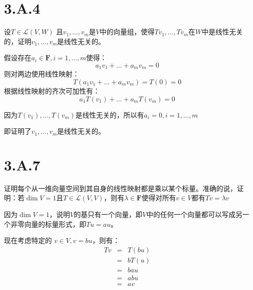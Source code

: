 \documentclass[10pt,a4paper,UTF8]{article}
\begin{document}
\section{3.A.4}
\label{sec:org779eb8a}


\begin{problem}
设\(T\in \mathcal{L}(V,W)\)  且\(v_{1},\ldots ,v_{m}\)是\(V\)中的向量组，使得\(Tv_{1},\ldots ,Tv_{m}\)在\(W\)中是线性无关的，证明\(v_{1},\ldots ,v_{m}\)是线性无关的。
\end{problem}

\begin{answer}
假设存在\(a_{i}\in \mathbf{F},i=1,\ldots ,m\)使得：
\begin{equation}
\label{eq:8}
a_{1}v_{1} + \ldots + a_{m}v_{m} = 0
\end{equation}
则对两边使用线性映射：
\begin{equation}
\label{eq:9}
T(a_{1}v_{1} + \ldots + a_{m}v_{m}) = T(0)=0
\end{equation}
根据线性映射的齐次可加性有：
\begin{equation}
\label{eq:10}
a_{1} T(v_{1}) + \ldots + a_{m}T(v_{m}) = 0
\end{equation}

因为\(T(v_{1}),\ldots ,T(v_{m})\)是线性无关的，所以有\(a_{i} = 0,i=1,\ldots ,m\)

即证明了\(v_{1},\ldots ,v_{m}\)是线性无关的。
\end{answer}
\section{3.A.7}
\label{sec:orgdea8748}


\begin{problem}
证明每个从一维向量空间到其自身的线性映射都是乘以某个标量。准确的说，证明：若\(\dim V = 1\)且\(T\in \mathcal{L}(V,V)\)，则有\(\lambda \in \mathbf{F}\)使得对所有\(v\in V\)都有\(Tv = \lambda v\)
\end{problem}

\begin{answer}
因为\(\dim V = 1\)，说明\(V\)的基只有一个向量，即\(V\)中的任何一个向量都可以写成另一个非零向量的标量形式，即\(Tu = au\)。

现在考虑特定的 \(v\in V,v = bu\)，则有：
\begin{eqnarray*}
Tv&=&T(bu) \\
&=&bT(u) \\
&=&bau \\
&=&abu\\
&=&av
\end{eqnarray*}
\end{answer}
\end{document}

